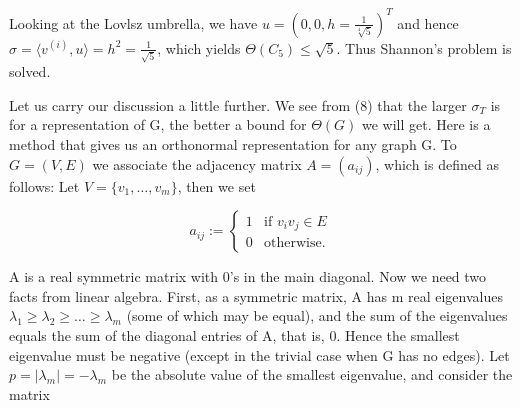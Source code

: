 \documentclass[openany,12pt]{memoir}
\newcommand{\setnewpagemargins}{
    \clearpage
    \setulmarginsandblock{2cm}{0.5cm}{*}
    \checkandfixthelayout
}
\begin{document}
Looking at the Lovlsz umbrella, we have $u = (0, 0, h = {\frac{1}{\sqrt[4]{5}}})^T$ and hence
$\sigma = \langle v^{(i)}, u \rangle = h^2 = {\frac{1}{\sqrt{5}}}$, which yields $\Theta(C_5) \leq \sqrt{5}$. Thus Shannon's 
problem is solved.


\setnewpagemargins

\hspace*{-2.5cm}

Let us carry our discussion a little further. We see from (8) that the larger $\sigma_T$
is for a representation of G, the better a bound for $\Theta(G)$ we will get. Here 
is a method that gives us an orthonormal representation for any graph G. 
To $G = (V, E)$ we associate the adjacency matrix $A = (a_{ij})$, which is 
defined as follows: Let $V = \{v_1,\ldots,v_m\}$, then we set

\[
a_{ij} := \left\{ \begin{array}{rcl}
  1 & \mbox{if $v_i v_j \in E$}\\
  0 & \mbox{otherwise.}
  \end{array}\right.
\]

A is a real symmetric matrix with 0's in the main diagonal. 
Now we need two facts from linear algebra. First, as a symmetric matrix, 
A has m real eigenvalues $\lambda_1 \geq \lambda_2 \geq \ldots \geq \lambda_m$ \spaceskip(some of which may 
be equal), and the sum of the eigenvalues equals the sum of the diagonal 
entries of A, that is, 0. Hence the smallest eigenvalue must be negative 
(except in the trivial case when G has no edges). Let $p = |\lambda_m| = -\lambda_m$ \spaceskip be 
the absolute value of the smallest eigenvalue, and consider the matrix
\end{document}
